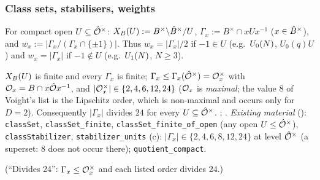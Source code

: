 \subsubsection{Class sets, stabilisers, weights}

\begin{definition}\label{def:s01-classset}
For compact open $U\subseteq\hat{\mathcal{O}}^\times$: $X_B(U):=B^\times\backslash\hat{B}^\times/U$,
$\Gamma_x:=B^\times\cap xUx^{-1}$ ($x\in\hat{B}^\times$), and $w_x:=|\Gamma_x/(\Gamma_x\cap\{\pm1\})|$.
Thus $w_x=|\Gamma_x|/2$ if $-1\in U$ (e.g.\ $U_0(N)$, $U_0(q)U$) and $w_x=|\Gamma_x|$ if $-1\notin U$
(e.g.\ $U_1(N)$, $N\ge3$).
\end{definition}

\begin{proposition}[finiteness]\label{prop:s01-finite}
$X_B(U)$ is finite and every $\Gamma_x$ is finite; $\Gamma_x\le\Gamma_x(\hat{\mathcal{O}}^\times)=\mathcal{O}_x^\times$ with $\mathcal{O}_x=B\cap x\hat{\mathcal{O}} x^{-1}$,
and $|\mathcal{O}_x^\times|\in\{2,4,6,12,24\}$ ($\mathcal{O}_x$ is \emph{maximal}; the value $8$ of Voight's list is the Lipschitz order,
which is non-maximal and occurs only for $D=2$). Consequently $|\Gamma_x|$ divides $24$ for every $U\subseteq\hat{\mathcal{O}}^\times$.
\stknown{} ; .
\emph{Existing material} (\stformal):  \texttt{classSet}, \texttt{classSet\_finite},
\texttt{classSet\_finite\_of\_open} (any open $U\le\hat{\mathcal{O}}^\times$), \texttt{classStabilizer}, \texttt{stabilizer\_units}
(c): $|\Gamma_x|\in\{2,4,6,8,12,24\}$ at level $\hat{\mathcal{O}}^\times$ (a superset: $8$ does not occur there);  \texttt{quotient\_compact}.
\end{proposition}
\noindent(``Divides 24'': $\Gamma_x\le\mathcal{O}_x^\times$ and each listed order divides $24$.)

